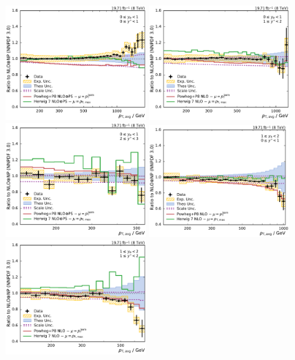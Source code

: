 \begin{figure}[htbp]
    \centering
    \includegraphics[width=0.48\textwidth]{figures/measurement/ratio_to_NNPDF30+np_varcomp_yb0ys0.pdf}\hfill
    \includegraphics[width=0.48\textwidth]{figures/measurement/ratio_to_NNPDF30+np_varcomp_yb0ys1.pdf}
    \includegraphics[width=0.48\textwidth]{figures/measurement/ratio_to_NNPDF30+np_varcomp_yb0ys2.pdf}\hfill
    \includegraphics[width=0.48\textwidth]{figures/measurement/ratio_to_NNPDF30+np_varcomp_yb1ys0.pdf}
    \includegraphics[width=0.48\textwidth]{figures/measurement/ratio_to_NNPDF30+np_varcomp_yb1ys1.pdf}\hfill

\end{figure}

